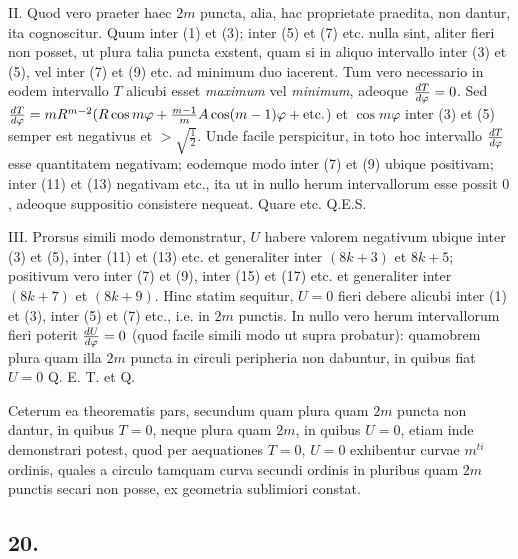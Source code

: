\documentclass[twoside,12pt, showframe]{memoir}
\let\oldfrac\frac
\def\frac#1#2{\mathchoice{\tfrac{#1}{#2}}{\oldfrac{#1}{#2}}{\genfrac{}{}{}{2}{#1}{#2\mathstrut}}{\genfrac{}{}{}{3}{#1}{#2\mathstrut}}}
\begin{document}
II. Quod vero praeter haec \(2m\) puncta, alia, hac proprietate praedita, non dantur, ita cognoscitur. Quum inter (1) et (3); inter (5) et (7) etc{.} nulla sint, aliter fieri non posset, ut plura talia puncta exstent, quam si in aliquo intervallo inter (3) et (5), vel inter (7) et (9) etc{.} ad minimum duo iacerent. Tum vero necessario in eodem intervallo \(T\) alicubi esset \textit{maximum} vel \textit{minimum}, adeoque \(\frac{dT}{d\varphi} = 0\). Sed \(\frac{dT}{d\varphi} = mR^{m-2}(R\cos m \varphi + \frac{m-1}{m} A \cos(m-1)\varphi + \text{etc{.}}\)) et \(\cos m\varphi \) inter (3) et (5) semper est negativus et \(>\surd{\tfrac{1}{2}}\). Unde facile perspicitur, in toto hoc intervallo \(\frac{dT}{d\varphi}\) esse quantitatem negativam; eodemque modo inter (7) et (9) ubique positivam; inter (11) et (13) negativam etc{.}, ita ut in nullo herum intervallorum esse possit \(0\), adeoque suppositio consistere nequeat.  Quare etc{.} Q.E.S.

III. Prorsus simili modo demonstratur, \(U\) habere valorem negativum ubique inter (3) et (5), inter (11) et (13) etc{.} et generaliter inter \((8k+3)\) et \(8k+5\); positivum vero inter (7) et (9), inter (15) et (17) etc{.} et generaliter inter \( (8k+7)\) et \((8k+9)\). Hinc statim sequitur, \(U=0\) fieri debere alicubi inter (1) et (3), inter (5) et (7) etc{.}, i.e. in \(2m\) punctis. In nullo vero herum intervallorum fieri poterit \(\frac{dU}{d\varphi}=0\) (quod facile simili modo ut supra probatur): quamobrem plura quam illa \(2m\) puncta in circuli peripheria non dabuntur, in quibus fiat \(U=0\) Q. E. T. et Q.

Ceterum ea theorematis pars, secundum quam plura quam \(2m\) puncta non dantur, in quibus \(T=0\), neque plura quam \(2m\), in quibus \(U = 0\), etiam inde demonstrari potest, quod per aequationes \(T = 0\), \(U=0\) exhibentur curvae \(m^{ti}\) ordinis, quales a circulo tamquam curva secundi ordinis in pluribus quam \(2m\) punctis secari non posse, ex geometria sublimiori constat.

\subsection*{20.}
\end{document}
